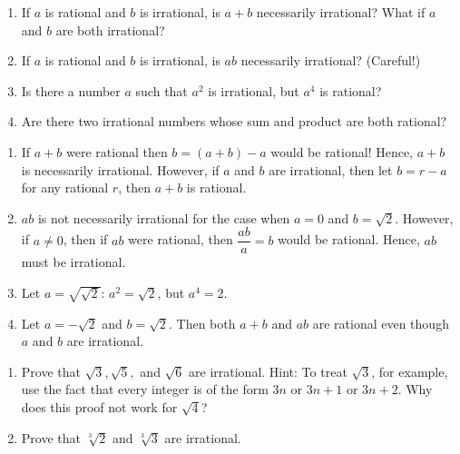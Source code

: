 \begin{pr} \label{2.12}%
  \begin{enumerate}[label=(\alph*)]
    \item If $a$ is rational and $b$ is irrational, is
    $a + b$ necessarily irrational? What if $a$ and $b$
    are both irrational?
    \item If $a$ is rational and $b$ is irrational,
    is $ab$ necessarily irrational? (Careful!)
    \item Is there a number $a$ such that $a^2$ is irrational,
    but $a^4$ is rational?
    \item Are there two irrational numbers whose sum and
    product are both rational?
  \end{enumerate}
\end{pr}

\begin{solution} %
  \begin{enumerate}[label=(\alph*)]
    \item If $a+b$ were rational then
    $b = (a+b) - a$ would be rational! Hence,
    $a+b$ is necessarily irrational. However,
    if $a$ and $b$ are irrational, then let $b = r - a$ for
    any rational $r$, then $a+b$ is rational.
    \item $ab$ is not necessarily irrational for the case
    when $a = 0$ and $b = \sqrt{2}$. However, if $a \neq 0$,
    then if $ab$ were rational, then $\dfrac{ab}{a} = b$
    would be rational. Hence, $ab$ must be irrational.
    \item Let $a = \sqrt{\sqrt{2}}$: $a^2 = \sqrt{2}$, but
    $a^4 = 2$.
    \item Let $a = -\sqrt{2}$ and $b = \sqrt{2}$. Then
    both $a+b$ and $ab$ are rational even though $a$
    and $b$ are irrational.
  \end{enumerate}
\end{solution}

\begin{pr} \label{2.13} %
  \begin{enumerate}[label=(\alph*)]
    \item Prove that $\sqrt{3},\sqrt{5},$ and $\sqrt{6}$ are
    irrational. Hint: To treat $\sqrt{3}$, for example, use
    the fact that every integer is of the form $3n$ or
    $3n + 1$ or $3n + 2$. Why does this proof not work for
    $\sqrt{4}$?
    \item Prove that $\sqrt[3]{2}$ and $\sqrt[3]{3}$ are
    irrational.
  \end{enumerate}
\end{pr}

